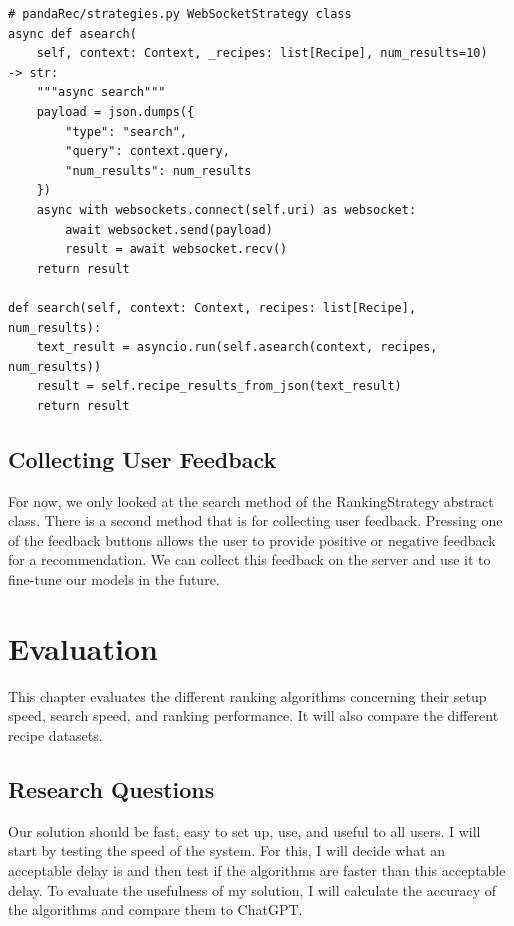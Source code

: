 \documentclass[
     12pt,                    %
     a4paper,             %
     BCOR=10mm,     %
     DIV=14,                 %
     listof=totoc,                    %
     bibliography=totoc,       %
     index=totoc,              %
     twoside,
     headsepline
     ]{scrreprt}
\begin{document}
\begin{listing}[htb]
	\begin{verbatim}
# pandaRec/strategies.py WebSocketStrategy class
async def asearch(
	self, context: Context, _recipes: list[Recipe], num_results=10)
-> str:
	"""async search"""
	payload = json.dumps({
		"type": "search",
		"query": context.query,
		"num_results": num_results
	})
	async with websockets.connect(self.uri) as websocket:
		await websocket.send(payload)
		result = await websocket.recv()
	return result

def search(self, context: Context, recipes: list[Recipe], num_results):
	text_result = asyncio.run(self.asearch(context, recipes, num_results))
	result = self.recipe_results_from_json(text_result)
	return result
	\end{verbatim}
	\caption[Web Socket Client]{Web Socket Client.\label{list:websocket}}
\end{listing}

\section{Collecting User Feedback}

For now, we only looked at the search method of the RankingStrategy abstract class. There is a second method that is for collecting user feedback. Pressing one of the feedback buttons allows the user to provide positive or negative feedback for a recommendation. We can collect this feedback on the server and use it to fine-tune our models in the future.

\chapter{Evaluation}\label{evaluation}

This chapter evaluates the different ranking algorithms concerning their setup speed, search speed, and ranking performance. It will also compare the different recipe datasets.

\section{Research Questions}

Our solution should be fast, easy to set up, use, and useful to all users. I will start by testing the speed of the system. For this, I will decide what an acceptable delay is and then test if the algorithms are faster than this acceptable delay. To evaluate the usefulness of my solution, I will calculate the accuracy of the algorithms and compare them to ChatGPT.
\end{document}
